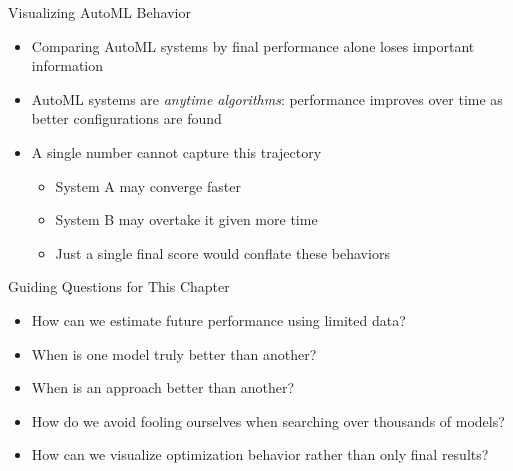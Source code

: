 \documentclass[main]{subfiles}
\begin{document}
\begin{frame}{Visualizing AutoML Behavior}
\begin{itemize}
    \item Comparing AutoML systems by final performance alone loses important information
    \item AutoML systems are \emph{anytime algorithms}: performance improves over time as better configurations are found
\end{itemize}

\vspace{.2cm}

\begin{minipage}{.48\textwidth}
\begin{itemize}
    \item A single number cannot capture this trajectory
    \begin{itemize}
        \item System A may converge faster
        \item System B may overtake it given more time
        \item Just a single final score would conflate these behaviors
    \end{itemize}
\end{itemize}
\end{minipage}
\hfill
\begin{minipage}{.46\textwidth}
\resizebox{\textwidth}{!}{

}
\end{minipage}
\end{frame}

\begin{frame}{Guiding Questions for This Chapter}
\begin{itemize}
    \item How can we estimate future performance using limited data?
    \item When is one model truly better than another?
    \item When is an approach better than another?
    \item How do we avoid fooling ourselves when searching over thousands of models?
    \item How can we visualize optimization behavior rather than only final results?
\end{itemize}

\end{frame}

\end{document}
